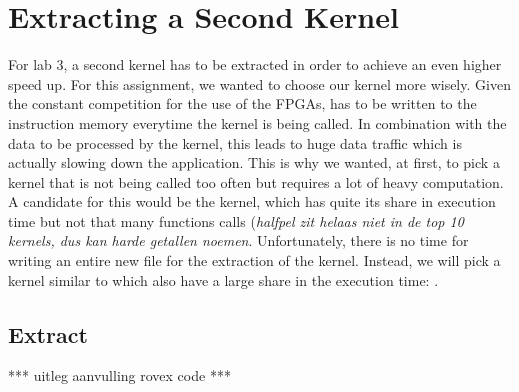 
\section{Extracting a Second Kernel}

For lab 3, a second kernel has to be extracted in order to achieve an even higher speed up. For this assignment, we wanted to choose our kernel more wisely. Given the constant competition for the use of the FPGAs,  has to be written to the instruction memory everytime the kernel is being called. In combination with the data to be processed by the kernel, this leads to huge data traffic which is actually slowing down the application. This is why we wanted, at first, to pick a kernel that is not being called too often but requires a lot of heavy computation. A candidate for this would be the  kernel, which has quite its share in execution time but not that many functions calls (\emph{halfpel zit helaas niet in de top 10 kernels, dus kan harde getallen noemen}. Unfortunately, there is no time for writing an entire new file for the extraction of the  kernel. Instead, we will pick a kernel similar to  which also have a large share in the execution time: .

\subsection{Extract }

*** uitleg aanvulling rovex code ***
